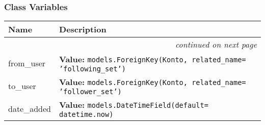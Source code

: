   \subsubsection{Class Variables}

    \vspace{-1cm}
\hspace{\varindent}\begin{longtable}{|p{\varnamewidth}|p{\vardescrwidth}|l}
\cline{1-2}
\cline{1-2} \centering \textbf{Name} & \centering \textbf{Description}& \\
\cline{1-2}
\endhead\cline{1-2}\multicolumn{3}{r}{\small\textit{continued on next page}}\\\endfoot\cline{1-2}
\endlastfoot\raggedright f\-r\-o\-m\-\_\-u\-s\-e\-r\- & \raggedright \textbf{Value:} 
{\tt models.ForeignKey(Konto, related\_name= 'following\_set')}&\\
\cline{1-2}
\raggedright t\-o\-\_\-u\-s\-e\-r\- & \raggedright \textbf{Value:} 
{\tt models.ForeignKey(Konto, related\_name= 'follower\_set')}&\\
\cline{1-2}
\raggedright d\-a\-t\-e\-\_\-a\-d\-d\-e\-d\- & \raggedright \textbf{Value:} 
{\tt models.DateTimeField(default= datetime.now)}&\\
\cline{1-2}
\end{longtable}

